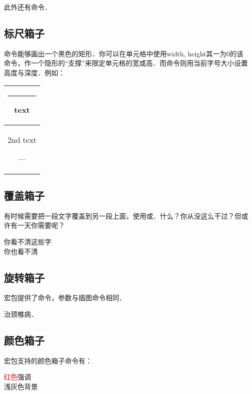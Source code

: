 此外还有命令．

\subsection{标尺箱子}
命令能够画出一个黑色的矩形．你可以在单元格中使用width, height其一为0的该命令，作一个隐形的“支撑”来限定单元格的宽或高．而命令则用当前字号大小设置高度与深度．例如：

\begin{codeshow}
\begin{tabular}{|c|}
  \hline
  \rule[-1em]{1em}{1ex}text
  \rule{0pt}{38pt} \\
  \hline
  2nd text\strut--- \\
  \hline
\end{tabular}
\end{codeshow}

\subsection{覆盖箱子}
有时候需要把一段文字覆盖到另一段上面，使用或．什么？你从没这么干过？但或许有一天你需要呢？

\begin{codeshow}
你看不清这些字\\
你也看不清
\end{codeshow}

\subsection{旋转箱子}
宏包提供了命令，参数与插图命令相同．
\begin{codeshow}
治颈椎病．
\end{codeshow}

\subsection{颜色箱子}
\label{subsec:colorbox}
宏包支持的颜色箱子命令有：

\begin{codeshow}
\textcolor{red}{红色}强调\\
\colorbox[gray]{0.95}{浅灰色背景} \\
\end{codeshow}

